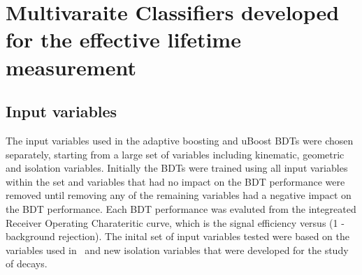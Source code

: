 \chapter{Multivaraite Classifiers developed for the effective lifetime measurement}
\label{sec:appendix2}


\section{Input variables}





The input variables used in the adaptive boosting and uBoost BDTs were chosen separately, starting from a large set of variables including kinematic, geometric and isolation variables. Initially the BDTs were trained using all input variables within the set and variables that had no impact on the BDT performance were removed until removing any of the remaining variables had a negative impact on the BDT performance. Each BDT performance was evaluted from the integreated Receiver Operating Charateritic curve, which is the signal efficiency versus (1 - background rejection). The inital set of input variables tested were based on the variables used in~\cite{} and new isolation variables that were developed for the study of \bmumu decays. 


